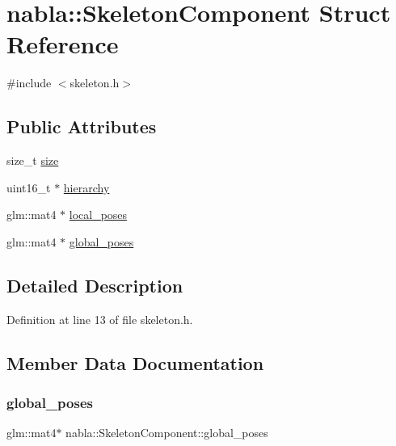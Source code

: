\hypertarget{structnabla_1_1_skeleton_component}{}\section{nabla\+::Skeleton\+Component Struct Reference}
\label{structnabla_1_1_skeleton_component}


{\ttfamily \#include $<$skeleton.\+h$>$}

\subsection*{Public Attributes}
\begin{DoxyCompactItemize}
\item 
size\+\_\+t \mbox{\hyperlink{structnabla_1_1_skeleton_component_a5f113384ea68640232b3d2c303217993}{size}}
\item 
uint16\+\_\+t $\ast$ \mbox{\hyperlink{structnabla_1_1_skeleton_component_a5664ecbfd1f97d8562214f68f828ee9d}{hierarchy}}
\item 
glm\+::mat4 $\ast$ \mbox{\hyperlink{structnabla_1_1_skeleton_component_abdfefff89b0414135c1ff87fbe9b390c}{local\+\_\+poses}}
\item 
glm\+::mat4 $\ast$ \mbox{\hyperlink{structnabla_1_1_skeleton_component_af41106e538a58ab213492c831ad9669c}{global\+\_\+poses}}
\end{DoxyCompactItemize}


\subsection{Detailed Description}


Definition at line 13 of file skeleton.\+h.



\subsection{Member Data Documentation}
\mbox{\label{structnabla_1_1_skeleton_component_af41106e538a58ab213492c831ad9669c}} 
\subsubsection{\texorpdfstring{global\_poses}{global\_poses}}
{\footnotesize\ttfamily glm\+::mat4$\ast$ nabla\+::\+Skeleton\+Component\+::global\+\_\+poses}



